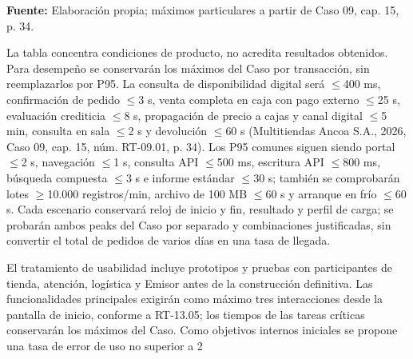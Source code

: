 \documentclass[11pt]{article}
\begin{document}
\textbf{Fuente:} Elaboración propia; máximos particulares a partir de Caso 09, cap. 15, p. 34.

La tabla concentra condiciones de producto, no acredita resultados obtenidos. Para desempeño se conservarán los máximos del Caso por transacción, sin reemplazarlos por P95. La consulta de disponibilidad digital será $\leq$400 ms, confirmación de pedido $\leq$3 s, venta completa en caja con pago externo $\leq$25 s, evaluación crediticia $\leq$8 s, propagación de precio a cajas y canal digital $\leq$5 min, consulta en sala $\leq$2 s y devolución $\leq$60 s (Multitiendas Ancoa S.A., 2026, Caso 09, cap. 15, núm. RT-09.01, p. 34). Los P95 comunes siguen siendo portal $\leq$2 s, navegación $\leq$1 s, consulta API $\leq$500 ms, escritura API $\leq$800 ms, búsqueda compuesta $\leq$3 s e informe estándar $\leq$30 s; también se comprobarán lotes $\geq$10.000 registros/min, archivo de 100 MB $\leq$60 s y arranque en frío $\leq$60 s. Cada escenario conservará reloj de inicio y fin, resultado y perfil de carga; se probarán ambos peaks del Caso por separado y combinaciones justificadas, sin convertir el total de pedidos de varios días en una tasa de llegada.

El tratamiento de usabilidad incluye prototipos y pruebas con participantes de tienda, atención, logística y Emisor antes de la construcción definitiva. Las funcionalidades principales exigirán como máximo tres interacciones desde la pantalla de inicio, conforme a RT-13.05; los tiempos de las tareas críticas conservarán los máximos del Caso. Como objetivos internos iniciales se propone una tasa de error de uso no superior a 2 %
\end{document}
